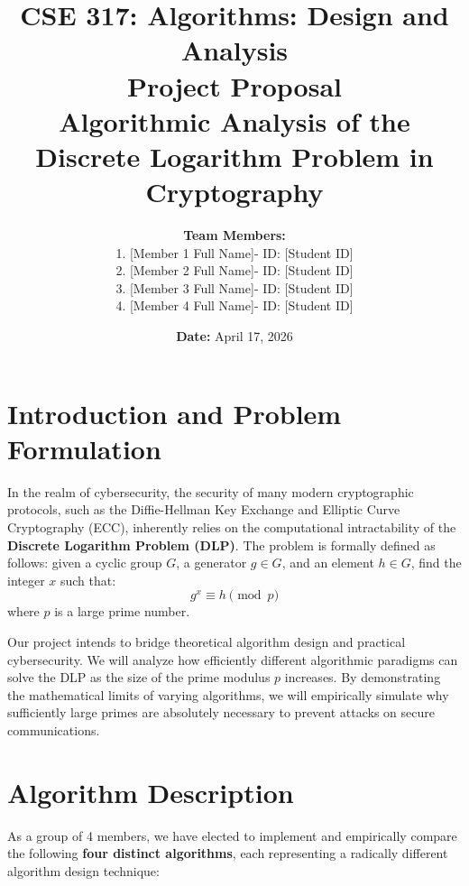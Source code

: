 \documentclass[12pt, a4paper]{article}
\title{
    \vspace{-1.5cm}
    \textbf{\Large CSE 317: Algorithms: Design and Analysis}\\
    \vspace{0.4cm}
    \textbf{\Large Project Proposal}\\
    \vspace{0.6cm}
    \Large \textbf{Algorithmic Analysis of the Discrete Logarithm Problem in Cryptography}
}
\author{
    \begin{tabular}{ll}
        \textbf{Team Members:} & \\
        1. [Member 1 Full Name] & - ID: [Student ID] \\
        2. [Member 2 Full Name] & - ID: [Student ID] \\
        3. [Member 3 Full Name] & - ID: [Student ID] \\
        4. [Member 4 Full Name] & - ID: [Student ID] \\
    \end{tabular}
}
\date{\textbf{Date:} April 17, 2026}
\begin{document}
\maketitle

\section{Introduction and Problem Formulation}
In the realm of cybersecurity, the security of many modern cryptographic protocols, such as the Diffie-Hellman Key Exchange and Elliptic Curve Cryptography (ECC), inherently relies on the computational intractability of the \textbf{Discrete Logarithm Problem (DLP)}. The problem is formally defined as follows: given a cyclic group $G$, a generator $g \in G$, and an element $h \in G$, find the integer $x$ such that:
$$g^x \equiv h \pmod p$$
where $p$ is a large prime number. 

Our project intends to bridge theoretical algorithm design and practical cybersecurity. We will analyze how efficiently different algorithmic paradigms can solve the DLP as the size of the prime modulus $p$ increases. By demonstrating the mathematical limits of varying algorithms, we will empirically simulate why sufficiently large primes are absolutely necessary to prevent attacks on secure communications.

\section{Algorithm Description}
As a group of 4 members, we have elected to implement and empirically compare the following \textbf{four distinct algorithms}, each representing a radically different algorithm design technique:
\end{document}
